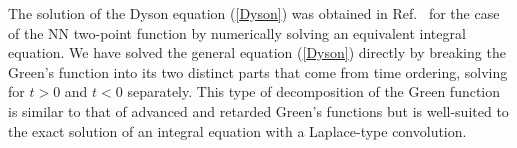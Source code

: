 \documentclass[aps,pra,preprint,groupedaddress]{revtex4-1}
\newcommand{\1}{\mathds{1}}
\begin{document}
The solution of the Dyson equation (\ref{Dyson}) was obtained in Ref.~ for the case of the NN two-point function by numerically solving an equivalent integral equation. We have solved the general equation (\ref{Dyson}) directly by breaking the Green's function into its two distinct parts that come from time ordering, solving for $t>0$ and $t<0$ separately. This type of decomposition of the Green function is similar to that of advanced and retarded Green's functions \cite{A&G,Zubarev} but is well-suited to the exact solution of an integral equation with a Laplace-type convolution.

\end{document}
